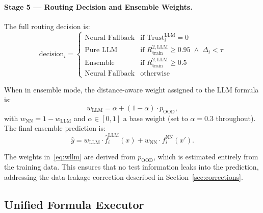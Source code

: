 \documentclass[twoside,11pt]{article}
\newcommand{\wLLM}{w_{\mathrm{LLM}}}
\newcommand{\wNN}{w_{\mathrm{NN}}}
\begin{document}
\paragraph{Stage 5 --- Routing Decision and Ensemble Weights.}
The full routing decision is:
\begin{equation}
  \mathrm{decision}_i = \begin{cases}
    \text{Neural Fallback} & \text{if Trust}_i^{\mathrm{LLM}} = 0 \\
    \text{Pure LLM}        & \text{if } {R^{2,\mathrm{LLM}}_{\mathrm{train}}} \ge 0.95 \;\land\; \Delta_i < \tau \\
    \text{Ensemble}        & \text{if } {R^{2,\mathrm{LLM}}_{\mathrm{train}}} \ge 0.5 \\
    \text{Neural Fallback} & \text{otherwise}
  \end{cases}
  \label{eq:routing}
\end{equation}

When in ensemble mode, the distance-aware weight assigned to the LLM formula is:
\begin{equation}
  \wLLM = \alpha + (1 - \alpha)\cdot p_{\mathrm{OOD}},
  \label{eq:wllm}
\end{equation}
with $\wNN = 1 - \wLLM$ and $\alpha \in [0,1]$ a base weight (set to $\alpha=0.3$
throughout).  The final ensemble prediction is:
\begin{equation}
  \hat{y} = \wLLM \cdot \hat{f}^{\mathrm{LLM}}_i(x) + \wNN \cdot f^{\mathrm{NN}}_i(x').
  \label{eq:ensemble}
\end{equation}

\begin{remark}
The weights in~\eqref{eq:wllm} are derived from $p_{\mathrm{OOD}}$, which is
estimated entirely from the training data.  This ensures that no test information
leaks into the prediction, addressing the data-leakage correction described in
Section~\ref{sec:corrections}.
\end{remark}

\subsection{Unified Formula Executor}\label{subsec:unified-formula-executor}
\label{sec:executor}
\end{document}

